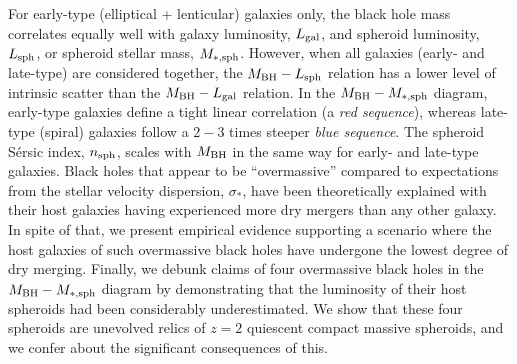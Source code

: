 For early-type (elliptical + lenticular) galaxies only, 
the black hole mass correlates equally well with galaxy luminosity, $L_{\rm gal}$, 
and spheroid luminosity, $L_{\rm sph}$, or spheroid stellar mass, $M_{\rm *,sph}$. 
However, when all galaxies (early- and late-type) are considered together, 
the $M_{\rm BH} - L_{\rm sph}$ relation has a lower level of intrinsic scatter than the $M_{\rm BH} - L_{\rm gal}$ relation. 
In the $M_{\rm BH} - M_{\rm *,sph}$ diagram, early-type galaxies define a tight linear correlation (a \emph{red sequence}), 
whereas late-type (spiral) galaxies follow a $2-3$ times steeper \emph{blue sequence}. 
The spheroid S\'ersic index, $n_{\rm sph}$, scales with $M_{\rm BH}$ 
in the same way for early- and late-type galaxies. 
Black holes that appear to be ``overmassive'' compared to expectations from the stellar velocity dispersion, $\sigma_*$, 
have been theoretically explained with their host galaxies having experienced more dry mergers than any other galaxy. 
In spite of that, we present empirical evidence supporting a scenario 
where the host galaxies of such overmassive black holes have undergone the lowest degree of dry merging. 
Finally, we debunk claims of four overmassive black holes in the $M_{\rm BH} - M_{\rm *,sph}$ diagram 
by demonstrating that the luminosity of their host spheroids had been considerably underestimated. 
We show that these four spheroids are unevolved relics of $z=2$ quiescent compact massive spheroids, 
and we confer about the significant consequences of this. 


